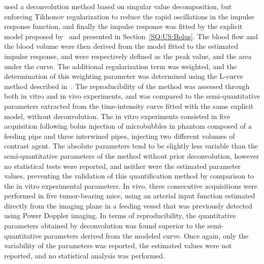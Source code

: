 \citet{Gauthier:2012vc} used a deconvolution method based on singular value decomposition, but enforcing Tikhonov regularization to reduce the rapid oscillations in the impulse response function, and finally the impulse response was fitted by the explicit model proposed by~\citet{Elie2014} and presented in Section~\ref{SQ:US:Bolus}.
The blood flow and the blood volume were then derived from the model fitted to the estimated impulse response, and were respectively defined as the peak value, and the area under the curve.
The additional regularization term was weighted, and the determination of this weighting parameter was determined using the L-curve method described in~\cite{Hansen:1992jx}.
The reproducibility of the method was assessed through both in vitro and in vivo experiments, and was compared to the semi-quantitative parameters extracted from the time-intensity curve fitted with the same explicit model, without deconvolution.
The in vitro experiments consisted in five acquisition following bolus injection of microbubbles in phantom composed of a feeding pipe and three interwined pipes, injecting two different volumes of contrast agent.
The absolute parameters tend to be slightly less variable than the semi-quantitative parameters of the method without prior deconvolution, however no statistical tests were reported, and neither were the estimated parameter values, preventing the validation of this quantification method by comparison to the in vitro experimental parameters.
In vivo, three consecutive acquisitions were performed in five tumor-bearing mice, using an arterial input function estimated directly from the imaging plane in a feeding vessel that was previously detected using Power Doppler imaging.
In terms of reproducibility, the quantitative parameters obtained by deconvolution was found superior to the semi-quantitative parameters derived from the modeled curve.
Once again, only the variability of the parameters was reported, the estimated values were not reported, and no statistical analysis was performed.

